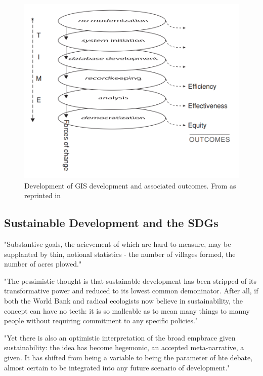 \begin{figure}[h]
	\centering
	\includegraphics[scale=0.4]{Figures/chap2/gis_equity.png}
	\caption[Development of GIS development and associated outcomes]{Development of GIS development and associated outcomes. From \cite{tullochTheoreticalModelMultipurpose1999} as reprinted in \cite{tullochInstitutionalGeographicInformation2007}}
	\label{fig:gis_equity}
\end{figure}



\subsection{Sustainable Development and the SDGs}

"Substantive goals, the acievement of which are hard to measure, may be supplanted by thin, notional statistics - the number of villages formed, the number of acres plowed." \cite{scottSeeingStateHow2020}


"The pessimistic thought is that sustainable development has been stripped of its transformative power and reduced to its lowest common demoninator. After all, if both the World Bank and radical ecologists now believe in sustainability, the concept can have no teeth: it is so malleable as to mean many things to manny people without requiring commitment to any specific policies." \cite{campbellGreenCitiesGrowing2016}

"Yet there is also an optimistic interpretation of the broad empbrace given sustainability: the idea has become hegemonic, an accepted meta-narrative, a given. It has shifted from being a variable to being the parameter of hte debate, almost certain to be integrated into any future scenario of development." \cite{campbellGreenCitiesGrowing2016}

